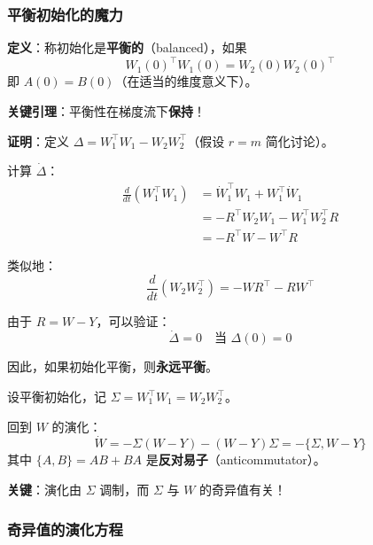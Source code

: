 \documentclass[12pt, a4paper]{ctexart}
\begin{document}
\subsubsection{平衡初始化的魔力}

\begin{blackboard}

\textbf{定义}：称初始化是\textbf{平衡的}（balanced），如果
\[
W_1(0)^\top W_1(0) = W_2(0) W_2(0)^\top
\]
即 $A(0) = B(0)$（在适当的维度意义下）。

\textbf{关键引理}：平衡性在梯度流下\textbf{保持}！

\textbf{证明}：定义 $\Delta = W_1^\top W_1 - W_2 W_2^\top$（假设 $r = m$ 简化讨论）。

计算 $\dot{\Delta}$：
\begin{align*}
\frac{d}{dt}(W_1^\top W_1) &= \dot{W}_1^\top W_1 + W_1^\top \dot{W}_1 \\
&= -R^\top W_2 W_1 - W_1^\top W_2^\top R \\
&= -R^\top W - W^\top R
\end{align*}

类似地：
\[
\frac{d}{dt}(W_2 W_2^\top) = -W R^\top - R W^\top
\]

由于 $R = W - Y$，可以验证：
\[
\dot{\Delta} = 0 \quad \text{当 } \Delta(0) = 0
\]

因此，如果初始化平衡，则\textbf{永远平衡}。

\end{blackboard}

\begin{blackboard}

设平衡初始化，记 $\Sigma = W_1^\top W_1 = W_2 W_2^\top$。

回到 $W$ 的演化：
\[
\dot{W} = -\Sigma(W - Y) - (W - Y)\Sigma = -\{\Sigma, W - Y\}
\]
其中 $\{A, B\} = AB + BA$ 是\textbf{反对易子}（anticommutator）。

\textbf{关键}：演化由 $\Sigma$ 调制，而 $\Sigma$ 与 $W$ 的奇异值有关！

\end{blackboard}

\subsubsection{奇异值的演化方程}
\end{document}
